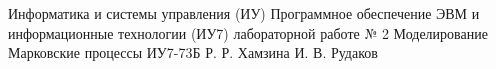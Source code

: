 \documentclass{bmstu}
\begin{document}
\makereporttitle
	{Информатика и системы управления (ИУ)}
	{Программное обеспечение ЭВМ и информационные технологии (ИУ7)}
	{лабораторной работе № 2}
	{Моделирование}
	{Марковские процессы}
	{}
	{ИУ7-73Б}
	{Р. Р. Хамзина}
	{И. В. Рудаков}

\maketableofcontents


\end{document}
